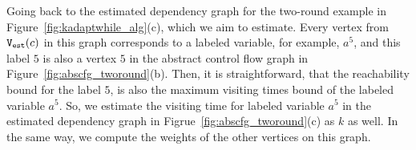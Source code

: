 Going back to the
estimated dependency graph for the two-round example in
Figure~\ref{fig:kadaptwhile_alg}(c), which we aim to estimate.
%
Every vertex from $\mathtt{{V_{est}}}(c)$ in this graph corresponds to a labeled variable, for example, $a^5$,
and this label $5$ is also a vertex $5$ in the abstract control flow graph in Figure~\ref{fig:abscfg_tworound}(b).
%
Then, it is straightforward, 
that the reachability bound for the label $5$, 
is also the maximum visiting times bound of the labeled variable $a^5$.
So, we estimate the visiting time for labeled variable $a^5$ in the estimated dependency graph in Figrue~\ref{fig:abscfg_tworound}(c) as $k$ as well.
%
In the same way, we compute the weights of the other vertices on this graph.
